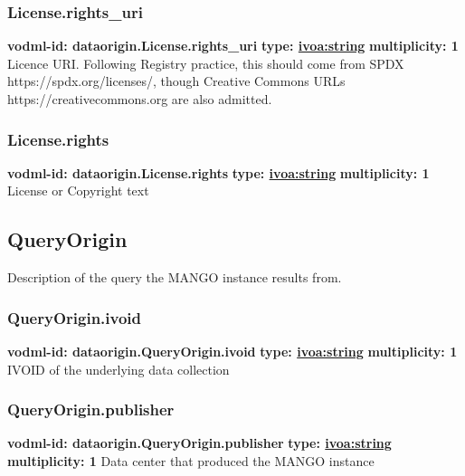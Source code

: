     \subsubsection{License.rights\_uri}
      \textbf{vodml-id: dataorigin.License.rights\_uri} \newline
      \textbf{type: \hyperref[sect:ivoa]{ivoa:string}} \newline
      \textbf{multiplicity: 1} \newline 
      Licence URI. Following Registry practice, this should come from SPDX https://spdx.org/licenses/, though Creative Commons URLs https://creativecommons.org are also admitted.

    \subsubsection{License.rights}
      \textbf{vodml-id: dataorigin.License.rights} \newline
      \textbf{type: \hyperref[sect:ivoa]{ivoa:string}} \newline
      \textbf{multiplicity: 1} \newline 
      License or Copyright text

  \subsection{QueryOrigin}
  \label{sect:dataorigin.QueryOrigin}
    Description of the query the MANGO instance results from.

    \subsubsection{QueryOrigin.ivoid}
      \textbf{vodml-id: dataorigin.QueryOrigin.ivoid} \newline
      \textbf{type: \hyperref[sect:ivoa]{ivoa:string}} \newline
      \textbf{multiplicity: 1} \newline 
      IVOID of the underlying data collection

    \subsubsection{QueryOrigin.publisher}
      \textbf{vodml-id: dataorigin.QueryOrigin.publisher} \newline
      \textbf{type: \hyperref[sect:ivoa]{ivoa:string}} \newline
      \textbf{multiplicity: 1} \newline 
      Data center that produced the MANGO instance

